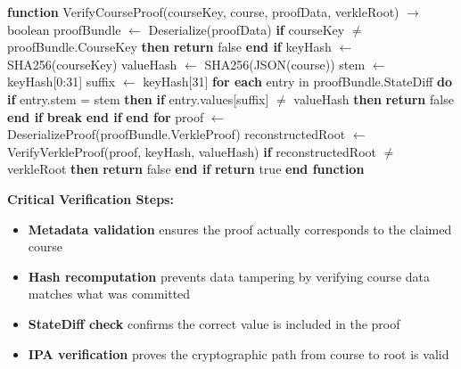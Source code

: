 \begin{algorithm}[H]
\caption{VerifyCourseProof - Validate Course Credential}
\label{alg:verify-course-proof}
\begin{algorithmic}[1]
\STATE \textbf{function} VerifyCourseProof(courseKey, course, proofData, verkleRoot) $\rightarrow$ boolean
\STATE \quad proofBundle $\leftarrow$ Deserialize(proofData)
\STATE
\STATE \quad \textbf{if} courseKey $\neq$ proofBundle.CourseKey \textbf{then}
\STATE \quad \quad \textbf{return} false 
\STATE \quad \textbf{end if}
\STATE
\STATE \quad keyHash $\leftarrow$ SHA256(courseKey)
\STATE \quad valueHash $\leftarrow$ SHA256(JSON(course))
\STATE
\STATE \quad stem $\leftarrow$ keyHash[0:31]
\STATE \quad suffix $\leftarrow$ keyHash[31]
\STATE
\STATE \quad \textbf{for each} entry in proofBundle.StateDiff \textbf{do}
\STATE \quad \quad \textbf{if} entry.stem = stem \textbf{then}
\STATE \quad \quad \quad \textbf{if} entry.values[suffix] $\neq$ valueHash \textbf{then}
\STATE \quad \quad \quad \quad \textbf{return} false 
\STATE \quad \quad \quad \textbf{end if}
\STATE \quad \quad \quad \textbf{break}
\STATE \quad \quad \textbf{end if}
\STATE \quad \textbf{end for}
\STATE
\STATE \quad proof $\leftarrow$ DeserializeProof(proofBundle.VerkleProof)
\STATE \quad reconstructedRoot $\leftarrow$ VerifyVerkleProof(proof, keyHash, valueHash)
\STATE
\STATE \quad \textbf{if} reconstructedRoot $\neq$ verkleRoot \textbf{then}
\STATE \quad \quad \textbf{return} false 
\STATE \quad \textbf{end if}
\STATE
\STATE \quad \textbf{return} true 
\STATE \textbf{end function}
\end{algorithmic}
\end{algorithm}

\textbf{Critical Verification Steps:}
\begin{itemize}
    \item \textbf{Metadata validation} ensures the proof actually corresponds to the claimed course
    \item \textbf{Hash recomputation} prevents data tampering by verifying course data matches what was committed
    \item \textbf{StateDiff check} confirms the correct value is included in the proof
    \item \textbf{IPA verification} proves the cryptographic path from course to root is valid
\end{itemize}

